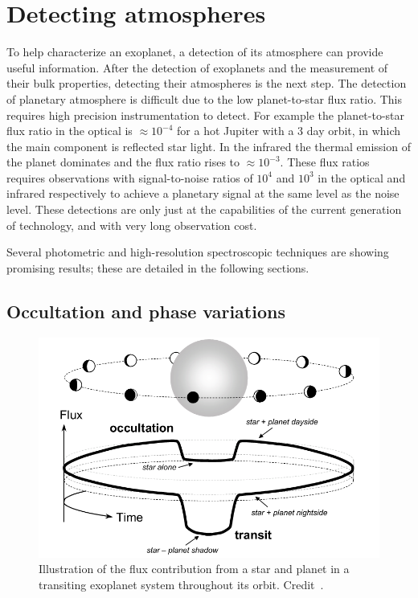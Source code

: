 
\section{Detecting atmospheres}
\label{sec:decting_atmopsheres}
To help characterize an exoplanet, a detection of its atmosphere can provide useful information.
After the detection of exoplanets and the measurement of their bulk properties, detecting their atmospheres is the next step.
The detection of planetary atmosphere is difficult due to the low planet-to-star flux ratio.
This requires high precision instrumentation to detect.
For example the planet-to-star flux ratio in the optical is $\approx 10^{-4}$ for a hot Jupiter with a 3 day orbit, in which the main component is reflected star light.
In the infrared the thermal emission of the planet dominates and the flux ratio rises to $\approx 10^{-3}$.
These flux ratios requires observations with signal-to-noise ratios of $10^4$ and $10^3$ in the optical and infrared respectively to achieve a planetary signal at the same level as the noise level.
These detections are only just at the capabilities of the current generation of technology, and with very long observation cost.

Several photometric and high-resolution spectroscopic techniques are showing promising results; these are detailed in the following sections.


\subsection{Occultation and phase variations}
\label{subsec:phase_variation}

\begin{figure}
    \centering
    \includegraphics[width=0.6\linewidth]{./figures/introduction/circular_diagram.png}
    \caption[Flux contribution from a star and planet in a transiting exoplanet system.]{Illustration of the flux contribution from a star and planet in a transiting exoplanet system throughout its orbit.
    Credit~\citet{winn_transits_2010}.}
    \label{fig:transits_and_occultations}
\end{figure}


